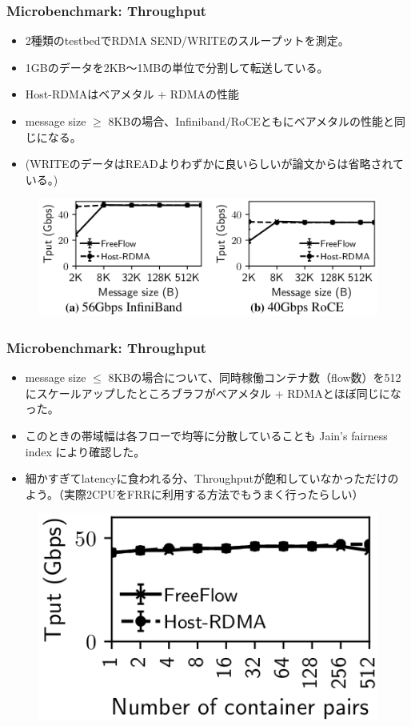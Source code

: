 \documentclass[dvipdfmx,9pt,notheorems]{beamer}
\theoremstyle{definition}
\begin{document}
\begin{frame}\frametitle{Microbenchmark: Throughput}
	\begin{itemize}
		\item 2種類のtestbedでRDMA SEND/WRITEのスループットを測定。
		\item 1GBのデータを2KB〜1MBの単位で分割して転送している。
		\item Host-RDMAはベアメタル + RDMAの性能
		\item message size $\geq$ 8KBの場合、Infiniband/RoCEともにベアメタルの性能と同じになる。
		\item (WRITEのデータはREADよりわずかに良いらしいが論文からは省略されている。)
	\end{itemize}
  \begin{figure}[htb]
    \centering
    \includegraphics[scale=1]{fig/figure9.png}
  \end{figure}
\end{frame}


\begin{frame}\frametitle{Microbenchmark: Throughput}
	\begin{itemize}
			\item message size $\leq$ 8KBの場合について、同時稼働コンテナ数（flow数）を512にスケールアップしたところブラフがベアメタル + RDMAとほぼ同じになった。
			\item このときの帯域幅は各フローで均等に分散していることも Jain's fairness index により確認した。
			\item 細かすぎてlatencyに食われる分、Throughputが飽和していなかっただけのよう。（実際2CPUをFRRに利用する方法でもうまく行ったらしい）
	\end{itemize}
  \begin{figure}[htb]
    \centering
		\includegraphics[scale=1]{fig/figure11.png}
  \end{figure}
\end{frame}
\end{document}
